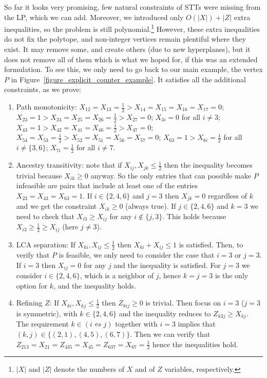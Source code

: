So far it looks very promising, few natural constraints of STTs were missing from the LP, which we can add. Moreover, we introduced only $O(|X|) + |Z|$ extra inequalities, so the problem is still polynomial.\footnote{$|X|$ and $|Z|$ denote the numbers of $X$ and of $Z$ variables, respectively.} However, these extra inequalities do not fix the polytope, and non-integer vertices remain plentiful where they exist. It may remove some, and create others (due to new hyperplanes), but it does not remove all of them which is what we hoped for, if this was an extended formulation. To see this, we only need to go back to our main example, the vertex $P$ in Figure~\ref{figure_explicit_counter_example}. It satisfies all the additional constraints, as we prove:

\begin{enumerate}
    \item Path monotonicity: $X_{12} = X_{13} = \frac{1}{2} > X_{14} = X_{15} = X_{16} = X_{17} = 0$; $X_{23} = 1 > X_{24} = X_{25} = X_{26} = \frac{1}{2} > X_{27} = 0$; $X_{3i} = 0$ for all $i \ne 3$; $X_{43} = 1 > X_{42} = X_{41} = X_{46} = \frac{1}{2} > X_{47} = 0$; $X_{54} = X_{53} = \frac{1}{2} > X_{52} = X_{51} = X_{56} = X_{57} = 0$; $X_{63} = 1 > X_{6i} = \frac{1}{2}$ for all $i \ne \{3,6\}$; $X_{7i} = \frac{1}{2}$ for all $i \ne 7$.
    
    \item Ancestry transitivity: note that if $X_{ij},X_{jk} \le \frac{1}{2}$ then the inequality becomes trivial because $X_{ik} \ge 0$ anyway. So the only entries that can possible make $P$ infeasible are pairs that include at least one of the entries $X_{23}=X_{43}=X_{63}=1$. If $i \in \{2,4,6\}$ and $j=3$ then $X_{jk}=0$ regardless of $k$ and we get the constraint $X_{ik} \ge 0$ (always true). If $j \in \{2,4,6\}$ and $k=3$ we need to check that $X_{i3} \ge X_{ij}$ for any $i \notin \{j,3\}$. This holds because $X_{i3} \ge \frac{1}{2} \ge X_{ij}$ (here $j \ne 3$).
        
    \item LCA separation: If $X_{ki},X_{ij} \le \frac{1}{2}$ then $X_{ki} + X_{ij} \le 1$ is satisfied. Then, to verify that $P$ is feasible, we only need to consider the case that $i=3$ or $j=3$. If $i=3$ then $X_{ij} = 0$ for any $j$ and the inequality is satisfied. For $j=3$ we consider $i \in \{2,4,6\}$, which is a neighbor of $j$, hence $k = j = 3$ is the only option for $k$, and the inequality holds.

    \item Refining $Z$: If $X_{ki},X_{kj} \le \frac{1}{2}$ then $Z_{kij} \ge 0$ is trivial. Then focus on $i=3$ ($j=3$ is symmetric), with $k \in \{2,4,6\}$ and the inequality reduces to $Z_{k3j} \ge X_{kj}$. The requirement $k \in (i \leftrightsquigarrow j)$ together with $i=3$ implies that $(k,j) \in \{ (2,1), (4,5), (6,7) \}$. Then we can verify that $Z_{213}  = X_{21} = Z_{435} = X_{45} =Z_{637}= X_{67}   = \frac{1}{2}$ hence the inequalities hold.


\end{enumerate}
